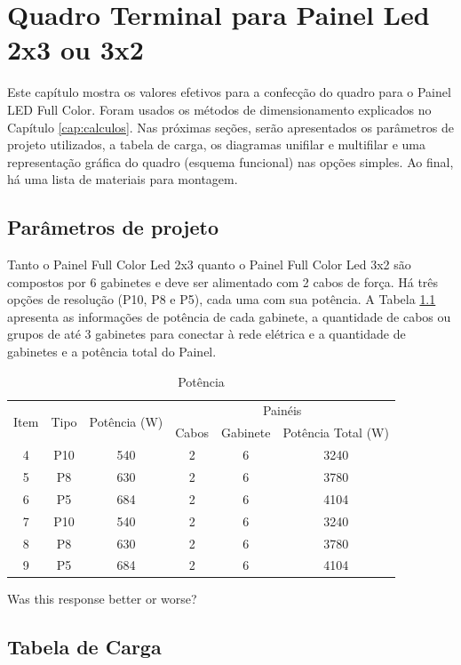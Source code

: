 \chapter{Quadro Terminal para Painel Led 2x3 ou 3x2}

Este capítulo mostra os valores efetivos para a confecção do quadro para o Painel LED Full Color. Foram usados os métodos de dimensionamento explicados no Capítulo \ref{cap:calculos}. Nas próximas seções, serão apresentados os parâmetros de projeto utilizados, a tabela de carga, os diagramas unifilar e multifilar e uma representação gráfica do quadro (esquema funcional) nas opções simples. Ao final, há uma lista de materiais para montagem.

\section{Parâmetros de projeto}

Tanto o Painel Full Color Led 2x3 quanto o Painel Full Color Led 3x2 são compostos por 6 gabinetes e deve ser alimentado com 2 cabos de força. Há três opções de resolução (P10, P8 e P5), cada uma com sua potência. A Tabela \ref{tab:pot_2x3} apresenta as informações de potência de cada gabinete, a quantidade de cabos ou grupos de até 3 gabinetes para conectar à rede elétrica e a quantidade de gabinetes e a potência total do Painel.

\begin{table}[htbp]
\caption{Potência}
\centering
\begin{tabular}{cccccc}
\toprule
\multirow{2}{*}{Item} & \multirow{2}{*}{Tipo} & \multirow{2}{*}{Potência (W)} & \multicolumn{3}{c}{Painéis} \\
\cmidrule{4-6}
& & & Cabos  & Gabinete & Potência Total (W) \\
\midrule
4 & P10 & 540 & 2 & 6 & 3240 \\
5 & P8 & 630 & 2 & 6 & 3780 \\
6 & P5 & 684 & 2 & 6 & 4104 \\
7 & P10 & 540 & 2 & 6 & 3240 \\
8 & P8 & 630 & 2 & 6 & 3780 \\
9 & P5 & 684 & 2 & 6 & 4104 \\
\bottomrule
\end{tabular}
\label{tab:pot_2x3}
\end{table}

Was this response better or worse?


\section{Tabela de Carga}
